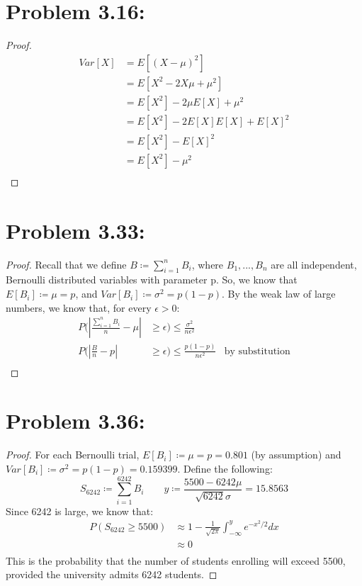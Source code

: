 \documentclass{article}
\begin{document}
\section*{Problem 3.16:}
\begin{proof}
\begin{align*}
Var[X] &= E[(X - \mu)^2] \\
&= E[X^2 - 2X\mu + \mu^2] \\
&= E[X^2] - 2\mu E[X] + \mu^2 \\
&= E[X^2] - 2E[X]E[X] + E[X]^2 \\
&= E[X^2] - E[X]^2 \\
&= E[X^2] - \mu^2 \\
\end{align*}
\end{proof}
\section*{Problem 3.33:}
\begin{proof}
Recall that we define $B \coloneqq \sum_{i = 1}^n B_i$, where $B_1, ... , B_n$ are all independent, Bernoulli distributed variables with parameter p. So, we know that $E[B_i] \coloneqq \mu = p$, and $Var[B_i] \coloneqq \sigma^2 = p(1 - p)$. By the weak law of large numbers, we know that, for every $\epsilon > 0$:
\begin{align*}
P\bigg(\left\lvert\frac{\sum_{i = 1}^n B_i}{n} - \mu \right\rvert &\geq \epsilon \bigg) \leq \frac{\sigma^2}{n\epsilon^2} \\
P\bigg(\left\lvert\frac{B}{n} - p \right\rvert &\geq \epsilon \bigg) \leq \frac{p(1 - p)}{n\epsilon^2} &\text{by substitution}\\
\end{align*}
\end{proof}
\section*{Problem 3.36:}
\begin{proof}
For each Bernoulli trial, $E[B_i] \coloneqq \mu = p = 0.801$ (by assumption) and $Var[B_i] \coloneqq \sigma^2 = p(1 - p) = 0.159399$. Define the following:
$$
S_{6242} \coloneqq \sum_{i = 1}^{6242} B_i \qquad
y \coloneqq \frac{5500 - 6242\mu}{\sqrt{6242}\sigma} = 15.8563
$$
Since 6242 is large, we know that:
\begin{align*}
P(S_{6242} \geq 5500) &\approx 1 - \frac{1}{\sqrt{2\pi}} \int_{- \infty}^y e^{- x^2 / 2} dx \\
&\approx 0 \\
\end{align*}
This is the probability that the number of students enrolling will exceed 5500, provided the university admits 6242 students.
\end{proof}
\end{document}
